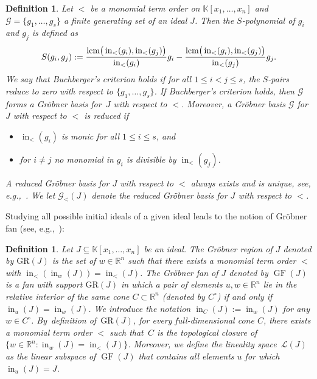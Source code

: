 \documentclass[pdftex]{sigma}%
\newtheorem{Definition}[Theorem]{Definition}
\numberwithin{equation}{section}
\DeclareMathOperator{\init}{in}
\DeclareMathOperator{\GF}{GF}
\begin{document}
\begin{Definition}
Let $<$ be a monomial term order on $\mathbb K[x_1, \dots , x_n]$ and $\mathcal{G}=\{g_1,\ldots,g_s\}$ a finite generating set of an ideal $J$.
Then the {\it $S$-polynomial} of $g_i$ and $g_j$ is defined as
\begin{displaymath}
S(g_i,g_j):=\frac{{\rm lcm}\big(\init_{<}(g_i),\init_{<}(g_j)\big)}{\init_{<}(g_i)}g_i-\frac{{\rm lcm}\big(\init_{<}(g_i),\init_{<}(g_j)\big)}{\init_{<}(g_j)}g_j.
\end{displaymath}
We say that {\it Buchberger's criterion} holds if for all $1\le i<j\le s$, the $S$-pairs reduce to zero with respect to $\{g_1,\dots,g_s\}$.
If Buchberger's criterion holds, then $\mathcal{G}$ forms a Gr\"obner basis for~$J$ with respect to $< $.
Moreover, a Gr\"obner basis $\mathcal{G}$ for $J$ with respect to $<$ is {\it reduced} if
\begin{itemize}\itemsep=0pt
 \item[$(i)$] $\init_<(g_i)$ is monic for all $1\leq i\leq s$, and
\item[$(ii)$] for $i\neq j$ no monomial in $g_i$ is divisible by $\init_<(g_j)$.
\end{itemize}
A reduced Gr\"obner basis for $J$ with respect to $<$ always exists and is unique, see, e.g.,~\cite[Theorem~2.2.7]{herzog2011monomial}.
We let $\mathcal{G}_{<}(J)$ denote the reduced Gr\"obner basis for $J$ with respect to $<$.
\end{Definition}



Studying all possible initial ideals of a given ideal leads to the notion of Gr\"obner fan (see, e.g.,~\cite[Proposition 2.4]{GB_Bernd}):

\begin{Definition}
Let $J\subseteq \mathbb K[x_1, \dots , x_n]$ be an ideal.
The {\it Gr\"obner region} of $J$ denoted by $\text{GR}(J)$ is the set of $w\in \mathbb R^n$ such that there exists a monomial term order $<$ with $\init_<(\init_w(J))=\init_<(J)$.
The {\it Gr\"obner fan} of $J$ denoted by $\GF(J)$ is a fan with support $\text{GR}(J)$ in which a pair of elements $u,w\in \mathbb R^n$ lie in the relative interior of the same cone $C\subset \mathbb R^n$ (denoted by $C^\circ$) if and only if $\init_u(J)=\init_w(J)$.
We introduce the notation $\init_C(J):=\init_w(J)$ for any $w\in C^\circ$.
By~definition of~$\text{GR}(J)$,
for every full-dimensional cone $C$, there exists a monomial term order $<$ such that~$C$ is the topological closure of $\{w\in \mathbb{R}^n\colon \init_w(J)=\init_<(J)\}$.
Moreover, we define the {\it lineality space}~$\mathcal L(J)$ as the linear subspace of $\GF(J)$ that contains all elements $u$ for which $\init_u(J)=J$.
\end{Definition}
\end{document}

